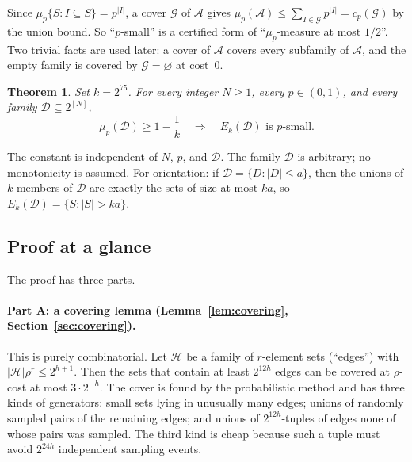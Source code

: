 \documentclass[11pt,letterpaper]{article}
\newtheorem{theorem}{Theorem}[section]
\theoremstyle{definition}
\theoremstyle{remark}
\numberwithin{equation}{section}
\begin{document}
Since $\mu_p\{S:I\subseteq S\}=p^{|I|}$, a cover $\mathcal G$ of $\mathcal A$
gives $\mu_p(\mathcal A)\le\sum_{I\in\mathcal G}p^{|I|}=c_p(\mathcal G)$ by the
union bound. So ``$p$-small'' is a certified form of ``$\mu_p$-measure at most
$1/2$''. Two trivial facts are used later: a cover of $\mathcal A$ covers every
subfamily of $\mathcal A$, and the empty family is covered by
$\mathcal G=\varnothing$ at cost~$0$.

\begin{theorem}
\label{thm:main}
Set $k=2^{75}$. For every integer $N\ge1$, every $p\in(0,1)$, and every
family $\mathcal D\subseteq2^{[N]}$,
\[
\mu_p(\mathcal D)\ge1-\frac1k
\quad\Longrightarrow\quad
E_k(\mathcal D)\text{ is }p\text{-small}.
\]
\end{theorem}

The constant is independent of $N$, $p$, and $\mathcal D$. The family
$\mathcal D$ is arbitrary; no monotonicity is assumed. For orientation: if
$\mathcal D=\{D:|D|\le a\}$, then the unions of $k$ members of $\mathcal D$ are
exactly the sets of size at most $ka$, so $E_k(\mathcal D)=\{S:|S|>ka\}$.

\subsection{Proof at a glance}
\label{sec:glance}

The proof has three parts.

\paragraph{Part A: a covering lemma (Lemma~\ref{lem:covering},
Section~\ref{sec:covering}).}
This is purely combinatorial. Let $\mathcal H$ be a family of $r$-element sets
(``edges'') with $|\mathcal H|\rho^r\le2^{h+1}$. Then the sets that contain at
least $2^{12h}$ edges can be covered at $\rho$-cost at most $3\cdot2^{-h}$.
The cover is found by the probabilistic method and has three kinds of
generators: small sets lying in unusually many edges; unions of randomly
sampled pairs of the remaining edges; and unions of $2^{12h}$-tuples of edges
none of whose pairs was sampled. The third kind is cheap because such a tuple
must avoid $2^{24h}$ independent sampling events.
\end{document}
